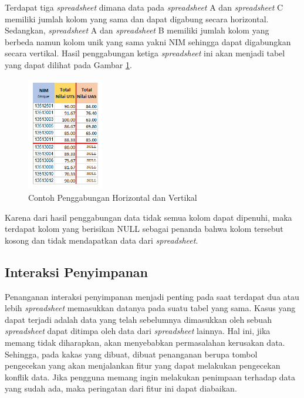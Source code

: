 \begin{enumerate}
	Terdapat tiga \textit{spreadsheet} dimana data pada \textit{spreadsheet} A dan \textit{spreadsheet} C memiliki jumlah kolom yang sama dan dapat digabung secara horizontal. Sedangkan, \textit{spreadsheet} A dan \textit{spreadsheet} B memiliki jumlah kolom yang berbeda namun kolom unik yang sama yakni NIM sehingga dapat digabungkan secara vertikal. Hasil penggabungan ketiga \textit{spreadsheet} ini akan menjadi tabel yang dapat dilihat pada Gambar \ref{BothMerge}.

	\begin{figure}[!htb]
	    \centering
	    \includegraphics[width=0.3\textwidth]{resources/chapter-3-both-merge-db.png}
	    \caption{Contoh Penggabungan Horizontal dan Vertikal}
		\label{BothMerge}
	\end{figure}

	Karena dari hasil penggabungan data tidak semua kolom dapat dipenuhi, maka terdapat kolom yang berisikan NULL sebagai penanda bahwa kolom tersebut kosong dan tidak mendapatkan data dari \textit{spreadsheet}.
\end{enumerate}

\subsection{Interaksi Penyimpanan}
Penanganan interaksi penyimpanan menjadi penting pada saat terdapat dua atau lebih \textit{spreadsheet} memasukkan datanya pada suatu tabel yang sama. Kasus yang dapat terjadi adalah data yang telah sebelumnya dimasukkan oleh sebuah \textit{spreadsheet} dapat ditimpa oleh data dari \textit{spreadsheet} lainnya. Hal ini, jika memang tidak diharapkan, akan menyebabkan permasalahan kerusakan data. Sehingga, pada kakas yang dibuat, dibuat penanganan berupa tombol pengecekan yang akan menjalankan fitur yang dapat melakukan pengecekan konflik data. Jika pengguna memang ingin melakukan penimpaan terhadap data yang sudah ada, maka peringatan dari fitur ini dapat diabaikan.

